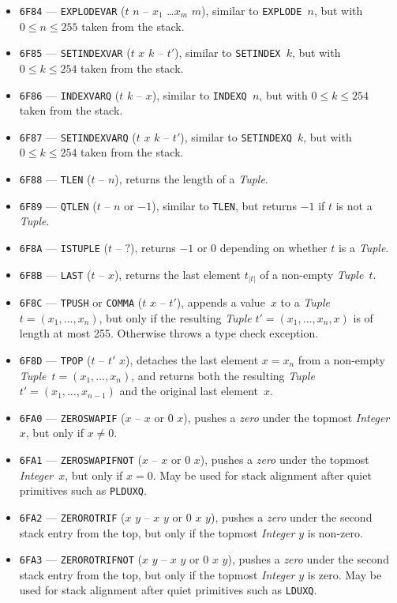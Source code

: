\documentclass[12pt,oneside]{article}
\begin{document}
\begin{itemize}
\item {\tt 6F84} --- {\tt EXPLODEVAR} ($t$ $n$ -- $x_1$ \dots $x_m$ $m$), similar to {\tt EXPLODE $n$}, but with $0\leq n\leq 255$ taken from the stack.
\item {\tt 6F85} --- {\tt SETINDEXVAR} ($t$ $x$ $k$ -- $t'$), similar to {\tt SETINDEX $k$}, but with $0\leq k\leq 254$ taken from the stack.
\item {\tt 6F86} --- {\tt INDEXVARQ} ($t$ $k$ -- $x$), similar to {\tt INDEXQ $n$}, but with $0\leq k\leq 254$ taken from the stack.
\item {\tt 6F87} --- {\tt SETINDEXVARQ} ($t$ $x$ $k$ -- $t'$), similar to {\tt SETINDEXQ $k$}, but with $0\leq k\leq 254$ taken from the stack.
\item {\tt 6F88} --- {\tt TLEN} ($t$ -- $n$), returns the length of a {\em Tuple}.
\item {\tt 6F89} --- {\tt QTLEN} ($t$ -- $n$ or $-1$), similar to {\tt TLEN}, but returns $-1$ if $t$ is not a {\em Tuple}.
\item {\tt 6F8A} --- {\tt ISTUPLE} ($t$ -- $?$), returns $-1$ or $0$ depending on whether $t$ is a {\em Tuple}.
\item {\tt 6F8B} --- {\tt LAST} ($t$ -- $x$), returns the last element $t_{|t|}$ of a non-empty {\em Tuple\/}~$t$.
\item {\tt 6F8C} --- {\tt TPUSH} or {\tt COMMA} ($t$ $x$ -- $t'$), appends a value~$x$ to a {\em Tuple\/} $t=(x_1,\ldots,x_n)$, but only if the resulting {\em Tuple\/} $t'=(x_1,\ldots,x_n,x)$ is of length at most 255. Otherwise throws a type check exception.
\item {\tt 6F8D} --- {\tt TPOP} ($t$ -- $t'$ $x$), detaches the last element $x=x_n$ from a non-empty {\em Tuple\/}~$t=(x_1,\ldots,x_n)$, and returns both the resulting {\em Tuple\/}~$t'=(x_1,\ldots,x_{n-1})$ and the original last element~$x$.
\item {\tt 6FA0} --- {\tt ZEROSWAPIF} ($x$ -- $x$ or $0$ $x$), pushes a {\em zero\/} under the topmost {\em Integer\/}~$x$, but only if $x\neq0$.
\item {\tt 6FA1} --- {\tt ZEROSWAPIFNOT} ($x$ -- $x$ or $0$ $x$), pushes a {\em zero\/} under the topmost {\em Integer\/}~$x$, but only if $x=0$. May be used for stack alignment after quiet primitives such as {\tt PLDUXQ}.
\item {\tt 6FA2} --- {\tt ZEROROTRIF} ($x$ $y$ -- $x$ $y$ or $0$ $x$ $y$), pushes a {\em zero\/} under the second stack entry from the top, but only if the topmost {\em Integer\/} $y$ is non-zero.
\item {\tt 6FA3} --- {\tt ZEROROTRIFNOT} ($x$ $y$ -- $x$ $y$ or $0$ $x$ $y$), pushes a {\em zero\/} under the second stack entry from the top, but only if the topmost {\em Integer\/} $y$ is zero. May be used for stack alignment after quiet primitives such as {\tt LDUXQ}.

\end{itemize}
\end{document}
